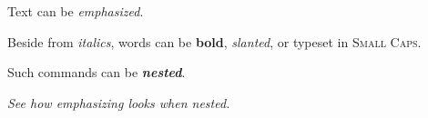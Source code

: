 \documentclass{article}
\begin{document}
Text can be \emph{emphasized}.

Beside from \textit{italics}, words can be 
\textbf{bold}, \textsl{slanted}, or typeset
in \textsc{Small Caps}.

Such commands can be \textit{\textbf{nested}}.

\emph{See how \emph{emphasizing} looks when nested.}
\end{document}
